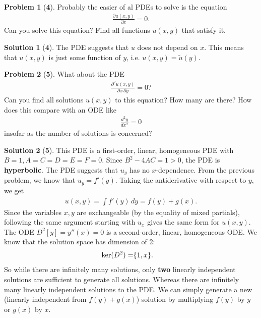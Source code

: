 \documentclass{article}
\theoremstyle{definition}
\newtheorem*{prob*}{Problem}
\newtheorem*{sln*}{Solution}
\begin{document}
\begin{prob*}[\textbf{4}]
	Probably the easier of al PDEs to solve is the equation
	\begin{align*}
	\frac{\partial u(x,y)}{\partial x} = 0.
	\end{align*}
	Can you solve this equation? Find all functions $u(x,y)$ that satisfy it.
	\begin{sln*}[\textbf{4}]
		The PDE suggests that $u$ does not depend on $x$. This means that $u(x,y)$ is just some function of $y$, i.e. $u(x,y) = \tilde{u}(y)$. 
	\end{sln*}
\end{prob*}

\begin{prob*}[\textbf{5}]
	What about the PDE
	\begin{align*}
	\frac{\partial^2 u(x,y)}{\partial x\,\partial y} = 0?
	\end{align*}
	Can you find all solutions $u(x,y)$ to this equation? How many are there? How does this compare with an ODE like
	\begin{align*}
	\frac{d^2 y}{d x^2} = 0
	\end{align*}
	insofar as the number of solutions is concerned?
	\begin{sln*}[\textbf{5}]
		This PDE is a first-order, linear, homogeneous PDE with $B = 1, A=C=D=E=F=0$. Since $B^2 - 4AC = 1 > 0$, the PDE is \textbf{hyperbolic}. The PDE suggests that $u_y$ has no $x$-dependence. From the previous problem, we know that $u_y = f'(y)$. Taking the antiderivative with respect to $y$, we get
		\begin{align*}
		\boxed{u(x,y) = \int f'(y)\,dy = f(y) + g(x)}.
		\end{align*} 
		Since the variables $x,y$ are exchangeable (by the equality of mixed partials), following the same argument starting with $u_x$ gives the same form for $u(x,y)$.\\
		
		\noindent The ODE $D^2[y] = y''(x) = 0$ is a second-order, linear, homogeneous ODE. We know that the solution space has dimension of 2:
		\begin{align*}
		\ker(D^2) = \span \{ 1, x \}.
		\end{align*} 
		So while there are infinitely many solutions, only \textbf{two} linearly independent solutions are sufficient to generate all solutions. Whereas there are infinitely many linearly independent solutions to the PDE. We can simply generate a new (linearly independent from $f(y) + g(x)$) solution by multiplying $f(y)$ by $y$ or $g(x)$ by $x$. 
	\end{sln*}
\end{prob*}
\end{document}
